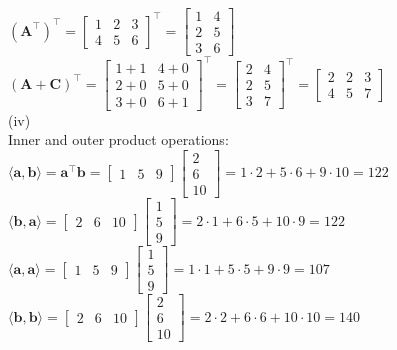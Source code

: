 \documentclass[11pt]{article}
\begin{document}
$(\mathbf{A}^\top)^\top = \begin{bmatrix}1&2&3\\4&5&6\end{bmatrix}^\top= \begin{bmatrix} 1 & 4 \\ 2 & 5 \\ 3 & 6 \end{bmatrix}$\quad
$(\mathbf{A}+\mathbf{C})^\top = \begin{bmatrix}1+1 & 4+0\\ 2+0 & 5+0\\ 3+0 & 6+1\end{bmatrix}^\top = \begin{bmatrix}2&4\\2&5\\3&7 \end{bmatrix}^\top=
\begin{bmatrix}2&2&3\\4&5&7 \end{bmatrix}$\\
(iv)\\
Inner and outer product operations: $\langle \mathbf{a,b}\rangle = \mathbf{a}^\top \mathbf{b}=
\begin{bmatrix}
    1&5&9
\end{bmatrix}\begin{bmatrix}
    2\\6\\10
\end{bmatrix}=1\cdot 2+5\cdot 6 +9\cdot 10=122$\\
$\langle \mathbf{b,a} \rangle= \begin{bmatrix}
    2&6&10
\end{bmatrix}\begin{bmatrix}
    1\\5\\9
\end{bmatrix}=2\cdot 1+6\cdot 5+10 \cdot 9= 122$\\
$\langle \mathbf{a,a} \rangle=\begin{bmatrix}
    1&5&9
\end{bmatrix}\begin{bmatrix}
    1\\5\\9
\end{bmatrix}=1\cdot 1+5\cdot 5+ 9\cdot 9 = 107$\\
$\langle \mathbf{b,b} \rangle= \begin{bmatrix}
    2&6&10
\end{bmatrix}\begin{bmatrix}
    2\\6\\10
\end{bmatrix}=2\cdot2 + 6\cdot 6 + 10\cdot 10 = 140$\\
\end{document}
